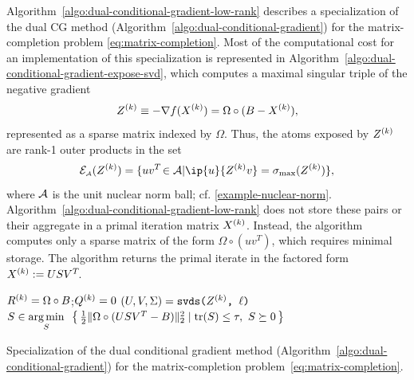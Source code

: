 \begin{example}
  Algorithm~\ref{algo:dual-conditional-gradient-low-rank} describes a specialization of
  the dual CG method (Algorithm~\ref{algo:dual-conditional-gradient}) for the
  matrix-completion problem \eqref{eq:matrix-completion}. Most of the
  computational cost for an implementation of this specialization is represented
  in Algorithm~\ref{algo:dual-conditional-gradient-expose-svd}, which computes a
  maximal singular triple of the negative gradient
  \[
    Z^{(k)}\equiv-\nabla f(X^{(k)}) = \Omega\circ(B-X^{(k)}),
  \]
  represented as a sparse matrix indexed by $\Omega$.  Thus, the atoms exposed
  by $Z^{(k)}$ are rank-1 outer products in the set
  \[
    \Escr\As(Z\k) = \{uv\T\in\Ascr | \ip{u}{Z\k v}=\sigma\submax(Z\k) \},
  \] 
  where $\mathcal{A}$ is the unit nuclear norm ball; cf. \autoref{example-nuclear-norm}.
  Algorithm~\ref{algo:dual-conditional-gradient-low-rank} does not store these pairs or
  their aggregate in a primal iteration matrix $X^{(k)}$. Instead, the algorithm
  computes only a sparse matrix of the form $\Omega\circ(u v^T)$, which requires
  minimal storage. The
  algorithm returns the primal iterate in the factored form $X^{(k)}:=USV^T\!$.
  \begin{algorithm}[t]
    \DontPrintSemicolon\setcounter{AlgoLine}{-1}
    $R^{(k)}=\Omega\circ B$;\enspace $Q^{(k)}=0$\;
    $(U, V, \Sigma) = \mbox{\tt svds($Z^{(k)}$, $\ell$)}$\label{algo:dual-conditional-gradient-low-rank-svd} 
    $S\in\underset{S}{\textrm{arg}\,{\min}}\enskip\left\{\,{\textstyle{\frac{1}{2}}}\|\Omega\circ(U SV^T-B)\|_2^2
      \mid \operatorname{tr}(S)\le\tau,\ S\succeq0\,\right\}$\label{cg-dual-recover-low-rank}\;
    \caption{Specialization of the dual conditional gradient method
    (Algorithm~\ref{algo:dual-conditional-gradient}) for the
    matrix-completion problem~\eqref{eq:matrix-completion}.\label{algo:dual-conditional-gradient-low-rank}}
  \end{algorithm}


\end{example}
